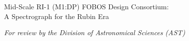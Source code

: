 \documentclass[oneside,11pt]{amsart}
\begin{document}


\vspace*{-1.5cm}


\centerline{\textsf {\Large Mid-Scale RI-1 (M1:DP) FOBOS Design Consortium: \\ A Spectrograph for the Rubin Era}}
\centerline{\emph{{\small For review by the Division of Astronomical Sciences (AST)}}}




\end{document}
